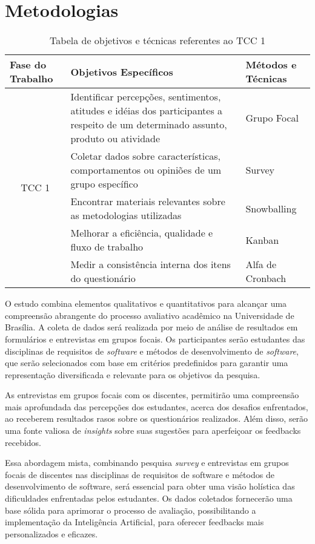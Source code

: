 \section{Metodologias}

\begin{table}[!ht]
    \centering
    \begin{tabularx}{\textwidth}{|X|X|X|}
    \hline
        Fase do Trabalho & Objetivos Específicos & Métodos e Técnicas \\ \hline
        \multicolumn{1}{c|}{\multirow{12}{*}{TCC 1}} & Identificar percepções, sentimentos, atitudes
        e idéias dos participantes a respeito de um determinado assunto, produto ou atividade & Grupo Focal \\ \cline{2-3}
        & Coletar dados sobre características, comportamentos ou opiniões de um grupo específico & Survey \\ \cline{2-3}
        & Encontrar materiais relevantes sobre as metodologias utilizadas & Snowballing \\ \cline{2-3}
        & Melhorar a eficiência, qualidade e fluxo de trabalho & Kanban \\ \cline{2-3}
        & Medir a consistência interna dos itens do questionário & Alfa de Cronbach \\ \hline
    \end{tabularx}
    \caption{Tabela de objetivos e técnicas referentes ao TCC 1}
\end{table}


O estudo combina elementos qualitativos e quantitativos para alcançar uma compreensão abrangente do processo avaliativo acadêmico na Universidade de Brasília. A coleta de dados será realizada por meio de análise de resultados em formulários e entrevistas em grupos focais. Os participantes serão estudantes das disciplinas de requisitos de \textit{software} e métodos de desenvolvimento de \textit{software}, que serão selecionados com base em critérios predefinidos para garantir uma representação diversificada e relevante para os objetivos da pesquisa.

As entrevistas em grupos focais com os discentes, permitirão uma compreensão mais aprofundada das percepções dos estudantes, acerca dos desafios enfrentados, ao receberem resultados rasos sobre os questionários realizados. Além disso, serão uma fonte valiosa de \textit{insights} sobre suas sugestões para aperfeiçoar os feedbacks recebidos.

Essa abordagem mista, combinando pesquisa \textit{survey} e entrevistas em grupos focais de discentes nas disciplinas de requisitos de software e métodos de desenvolvimento de software, será essencial para obter uma visão holística das dificuldades enfrentadas pelos estudantes. Os dados coletados fornecerão uma base sólida para aprimorar o processo de avaliação, possibilitando a implementação da Inteligência Artificial, para oferecer feedbacks mais personalizados e eficazes.

